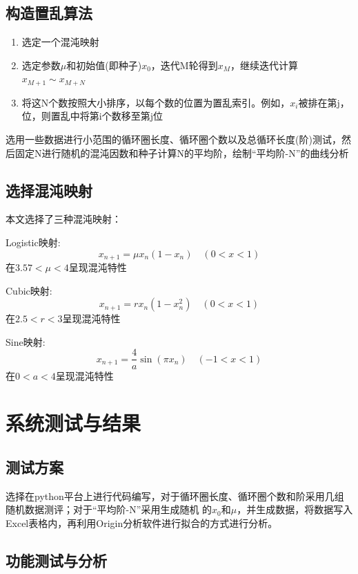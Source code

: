 \documentclass[a4paper]{article}
\begin{document}
\subsection{构造置乱算法}
\begin{enumerate}
  \item 选定一个混沌映射
  \item 选定参数$\mu$和初始值(即种子)$x_0$，迭代M轮得到$x_M$，继续迭代计算$x_{M+1}\sim x_{M+N}$
  \item 将这N个数按照大小排序，以每个数的位置为置乱索引。例如，$x_i$被排在第j，位，则置乱中将第i个数移至第j位
\end{enumerate}
选用一些数据进行小范围的循环圈长度、循环圈个数以及总循环长度(阶)测试，然后固定N进行随机的混沌因数和种子计算N的平均阶，绘制“平均阶-N”的曲线分析

\subsection{选择混沌映射}
本文选择了三种混沌映射：\par
Logistic映射:
$$
x_{n+1} = \mu x_n(1-x_n) \quad (0<x<1)
$$
在$3.57<\mu<4$呈现混沌特性\par
Cubic映射:
$$
x_{n+1} = rx_n(1-x_n^2) \quad (0<x<1)
$$
在$2.5<r<3$呈现混沌特性\par
Sine映射:
$$
x_{n+1} = \frac{4}{a}\sin(\pi x_n) \quad (-1<x<1)
$$
在$0<a<4$呈现混沌特性\par
\clearpage
\section{系统测试与结果}

\subsection{测试方案}
选择在python平台上进行代码编写，对于循环圈长度、循环圈个数和阶采用几组随机数据测评；对于“平均阶-N”采用生成随机
的$x_0$和$\mu$，并生成数据，将数据写入Excel表格内，再利用Origin分析软件进行拟合的方式进行分析。

\subsection{功能测试与分析}
\end{document}
